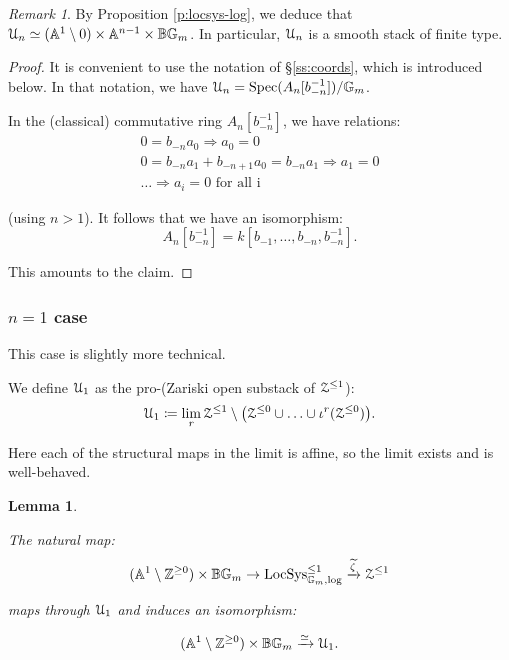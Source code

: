 \documentclass[reqno,11pt]{amsart}
\numberwithin{equation}{subsection}
\newtheorem{lem}[thm]{Lemma}
\theoremstyle{remark}
\newtheorem{rem}[thm]{Remark}
\newcommand{\xar}[1]{\xrightarrow{#1}}
\newcommand{\rar}[1]{\xar{#1}}
\newcommand{\isom}{\rar{\simeq}}
\newcommand{\bA}{{\mathbb A}}
\newcommand{\bB}{{\mathbb B}}
\newcommand{\bG}{{\mathbb G}}
\newcommand{\bZ}{{\mathbb Z}}
\newcommand{\sU}{{\EuScript U}}
\newcommand{\sZ}{{\EuScript Z}}
\newcommand{\on}{\operatorname}
\newcommand{\Spec}{\on{Spec}}
\newcommand{\LocSys}{\on{LocSys}}
\renewcommand{\lim}{\on{lim}}
\begin{document}
\begin{rem}

By Proposition \ref{p:locsys-log}, we deduce that $\sU_n \simeq 
(\bA^1 \setminus 0 ) \times \bA^{n-1} \times \bB \bG_m$. In particular,
$\sU_n$ is a smooth stack of finite type. 

\end{rem}

\begin{proof} 

It is convenient to use the notation of \S \ref{ss:coords}, which is introduced
below.
In that notation, we have $\sU_n = \Spec(A_n[b_{-n}^{-1}])/\bG_m$.

In the (classical) commutative ring $A_n[b_{-n}^{-1}]$, we have relations:
%
\[
\begin{gathered}
0 = b_{-n} a_0 \Rightarrow a_0 = 0 \\
0 = b_{-n} a_1 + b_{-n+1} a_0 = b_{-n} a_1 \Rightarrow a_1 = 0 \\
\ldots \Rightarrow a_i = 0 \text{ for all i}
\end{gathered}
\]

\noindent (using $n>1$).
It follows that we have an isomorphism:
%
\[
A_n[b_{-n}^{-1}] = k[b_{-1},\ldots,b_{-n},b_{-n}^{-1}].
\]

\noindent This amounts to the claim.  

\end{proof}

\subsubsection{$n = 1$ case} 

This case is slightly more technical.

We define $\sU_1$ as the pro-(Zariski open substack of $\sZ^{\leq 1}$):
%
\[
\sU_1 \coloneqq \underset{r}{\lim} \, {\sZ^{\leq 1} \setminus  
\big(\sZ^{\leq 0} \cup \ldots \cup \iota^r(\sZ^{\leq 0})\big)}.
\] 

\noindent Here each of the structural maps in the limit is affine, 
so the limit exists and is well-behaved. 

\begin{lem}\label{l:u1}

The natural map:
%
\[
(\bA^1 \setminus \bZ^{\geq 0}) \times \bB \bG_m \to 
\LocSys_{\bG_m,\log}^{\leq 1} \xar{\widetilde{\zeta}} 
\sZ^{\leq 1}
\]

\noindent maps through $\sU_1$ and induces an isomorphism:

\[
(\bA^1 \setminus \bZ^{\geq 0}) \times \bB \bG_m \isom \sU_1.
\]

\end{lem}
\end{document}
